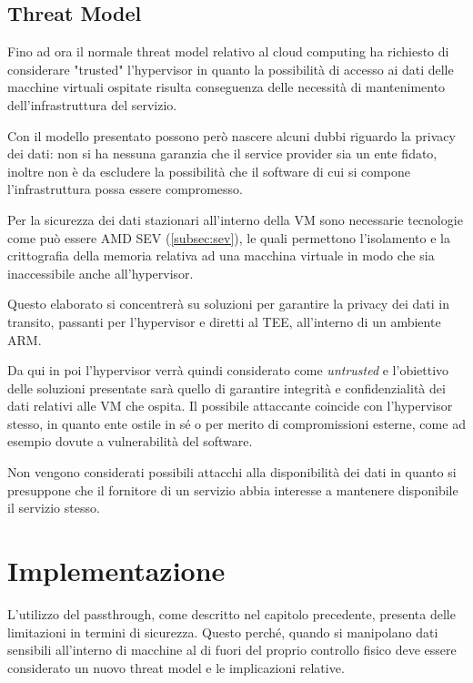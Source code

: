 \documentclass[12pt,italian]{report}
\begin{document}
	
	\newpage
	
	\section{Threat Model}
	\label{sec:threat_model}
	Fino ad ora il normale threat model relativo al cloud computing ha richiesto di considerare "trusted" l'hypervisor in quanto la possibilità di accesso ai dati delle macchine virtuali ospitate risulta conseguenza delle necessità di mantenimento dell'infrastruttura del servizio.
	
	Con il modello presentato possono però nascere alcuni dubbi riguardo la privacy dei dati: non si ha nessuna garanzia che il service provider sia un ente fidato, inoltre non è da escludere la possibilità che il software di cui si compone l'infrastruttura possa essere compromesso.
	
	\bigbreak
	
	Per la sicurezza dei dati stazionari all'interno della VM sono necessarie tecnologie come può essere AMD SEV (\ref{subsec:sev}), le quali permettono l'isolamento e la crittografia della memoria relativa ad una macchina virtuale in modo che sia inaccessibile anche all'hypervisor.
	
	Questo elaborato si concentrerà su soluzioni per garantire la privacy dei dati in transito, passanti per l'hypervisor e diretti al TEE, all'interno di un ambiente ARM. 
	
	\bigbreak
	
	Da qui in poi l'hypervisor verrà quindi considerato come \textit{untrusted} e l'obiettivo delle soluzioni presentate sarà quello di garantire integrità e confidenzialità dei dati relativi alle VM che ospita. Il possibile attaccante coincide con l'hypervisor stesso, in quanto ente ostile in sé o per merito di compromissioni esterne, come ad esempio dovute a vulnerabilità del software.
	
	Non vengono considerati possibili attacchi alla disponibilità dei dati in quanto si presuppone che il fornitore di un servizio abbia interesse a mantenere disponibile il servizio stesso.
	
	\chapter{Implementazione}
	\label{cap:implementazione}
	
	L'utilizzo del passthrough, come descritto nel capitolo precedente, presenta delle limitazioni in termini di sicurezza. Questo perché, quando si manipolano dati sensibili all'interno di macchine al di fuori del proprio controllo fisico deve essere considerato un nuovo threat model e le implicazioni relative. 
	
\end{document}
